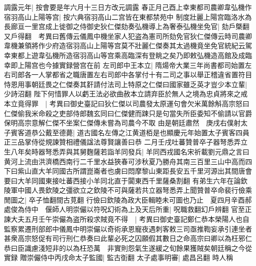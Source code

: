 調露元年|{
	按會要是年六月十三日方改元調露}
春正月己酉上幸東都司農卿韋弘機作宿羽高山上陽等宫|{
	按六典宿羽高山二宫皆在東都禁苑中}
制度壯麗上陽宫臨洛水為長廊亘一里宫成上徙御之侍御史狄仁傑劾奏弘機導上為奢泰弘機坐免官|{
	劾戶槩翻又戶得翻　考異曰舊傳云儀鳳中機坐家人犯盗為憲司所劾免官狄仁傑傳云時司農卿韋機兼領將作少府造宿羽高山上陽等宫莫不壯麗仁傑奏其太過機竟坐免官統紀云駕幸東都上遊韋弘機所造宿羽高山等宫乘高臨深有登眺之矣乃即敕弘機造高館及成臨幸即上陽宫也今據實録營宫在前}
左司郎中王本立|{
	隋煬帝大業三年尚書都司始置左右司郎各一人掌都省之職唐置左右司郎中各掌付十有二司之事以舉正稽違省置符目}
恃恩用事朝廷畏之仁傑奏其姧請付法司上特原之仁傑曰國家雖乏英才豈少本立輩|{
	少詩沼翻}
陛下何惜罪人以虧王法必欲曲赦本立請弃臣於無人之境為忠貞將來之戒本立竟得罪　|{
	考異曰御史臺記曰狄仁傑以司農發太原運句會欠米萬餘斛高宗怒曰仁傑偷我米命殺之吏部侍郎魏玄同曰仁傑健而踈只是句當失所臣委知不偷請以官爵保明高宗意解仁傑不坐案仁傑傳未嘗為司農今不取}
由是朝廷肅然　庚戌右僕射太子賓客道恭公戴至德薨|{
	道古國名左傳之江黄道栢是也顯慶元年始置太子賓客四員正三品掌侍從規諫贊相禮儀諡法尊賢讓善曰恭}
二月壬戌吐蕃贊普卒子器弩悉弄立生八年矣時器弩悉弄與其舅麴薩若詣羊同發兵|{
	羊同西戎國名宋祈載劉元鼎之言曰黄河上流由洪濟橋西南行二千里水益狹春可涉秋夏乃勝舟其南三百里三山中高而四下曰紫山直大羊同國古所謂崑崙者也虜曰悶摩黎山東距長安五千里河源出其間唐會要曰大羊同國東接吐蕃西接小羊同北直于闐東西千里薩桑割翻}
有弟生六年在論欽陵軍中國人畏欽陵之彊欲立之欽陵不可與薩若共立器弩悉弄上聞贊普卒命裴行儉乘閒圖之|{
	卒子恤翻間古莧翻}
行儉曰欽陵為政大臣輯睦未可圖也乃止　夏四月辛酉郝處俊為侍中　偃師人明崇儼以符呪幻術為上及天后所重|{
	呪職救翻幻戶辨翻}
官至正諫大夫五月壬午崇儼為盗所殺求賊竟不得　|{
	考異曰御史臺記鄭仁恭本榮陽人也自監察累遷刑部郎中儀鳳中明崇儼以奇術承恩寵夜遇刺客敕三司亟推鞫妄承引連坐者甚衆高宗怒促有司行刑仁恭奏曰此輩必死之囚願假其數日之命高宗曰卿以為枉邪仁恭曰臣識慮淺短非的以為枉恐萬　非實則怨氣生遂緩之旬餘果獲賊矣朝廷稱之今從實録}
贈崇儼侍中丙戌命太子監國|{
	監古衘翻}
太子處事明審|{
	處昌呂翻}
時人稱

